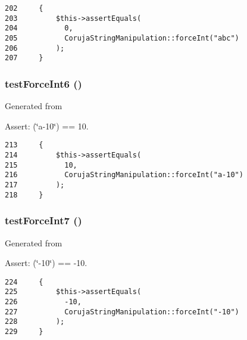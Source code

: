 \begin{Code}\begin{verbatim}202     {
203         $this->assertEquals(
204           0,
205           CorujaStringManipulation::forceInt("abc")
206         );
207     }
\end{verbatim}
\end{Code}


\hypertarget{class_coruja_string_manipulation_test_cbf475b9875a4f6fba120219b9be4855}{
\subsubsection[{testForceInt6}]{\setlength{\rightskip}{0pt plus 5cm}testForceInt6 ()}}
\label{class_coruja_string_manipulation_test_cbf475b9875a4f6fba120219b9be4855}


Generated from \begin{Desc}
\item[Assert:](\char`\"{}a-10\char`\"{}) == 10. \end{Desc}


\begin{Code}\begin{verbatim}213     {
214         $this->assertEquals(
215           10,
216           CorujaStringManipulation::forceInt("a-10")
217         );
218     }
\end{verbatim}
\end{Code}


\hypertarget{class_coruja_string_manipulation_test_60d61c4ca1e3dc5ed97b58a592075cbb}{
\subsubsection[{testForceInt7}]{\setlength{\rightskip}{0pt plus 5cm}testForceInt7 ()}}
\label{class_coruja_string_manipulation_test_60d61c4ca1e3dc5ed97b58a592075cbb}


Generated from \begin{Desc}
\item[Assert:](\char`\"{}-10\char`\"{}) == -10. \end{Desc}


\begin{Code}\begin{verbatim}224     {
225         $this->assertEquals(
226           -10,
227           CorujaStringManipulation::forceInt("-10")
228         );
229     }
\end{verbatim}
\end{Code}


